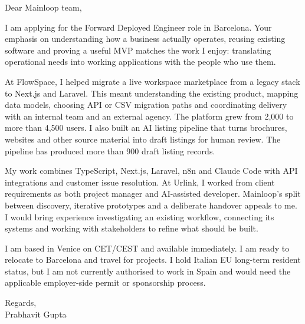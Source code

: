 \documentclass[a4paper,11pt]{article}
\begin{document}
Dear Mainloop team,

I am applying for the Forward Deployed Engineer role in Barcelona. Your emphasis on understanding how a business actually operates, reusing existing software and proving a useful MVP matches the work I enjoy: translating operational needs into working applications with the people who use them.

At FlowSpace, I helped migrate a live workspace marketplace from a legacy stack to Next.js and Laravel. This meant understanding the existing product, mapping data models, choosing API or CSV migration paths and coordinating delivery with an internal team and an external agency. The platform grew from 2,000 to more than 4,500 users. I also built an AI listing pipeline that turns brochures, websites and other source material into draft listings for human review. The pipeline has produced more than 900 draft listing records.

My work combines TypeScript, Next.js, Laravel, n8n and Claude Code with API integrations and customer issue resolution. At Urlink, I worked from client requirements as both project manager and AI-assisted developer. Mainloop's split between discovery, iterative prototypes and a deliberate handover appeals to me. I would bring experience investigating an existing workflow, connecting its systems and working with stakeholders to refine what should be built.

I am based in Venice on CET/CEST and available immediately. I am ready to relocate to Barcelona and travel for projects. I hold Italian EU long-term resident status, but I am not currently authorised to work in Spain and would need the applicable employer-side permit or sponsorship process.

Regards,\\
Prabhavit Gupta
\end{document}
